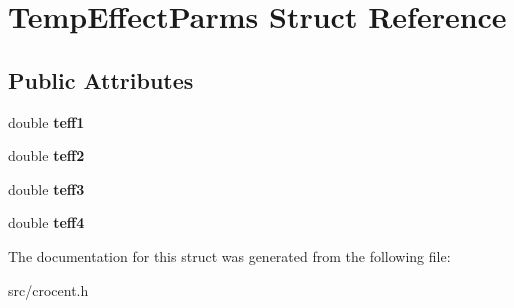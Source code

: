 \hypertarget{struct_temp_effect_parms}{\section{Temp\-Effect\-Parms Struct Reference}
\label{struct_temp_effect_parms}
}
\subsection*{Public Attributes}
\begin{DoxyCompactItemize}
\item 
\hypertarget{struct_temp_effect_parms_afa01c3717f65f25cdce2c831ed492a09}{double {\bfseries teff1}}\label{struct_temp_effect_parms_afa01c3717f65f25cdce2c831ed492a09}

\item 
\hypertarget{struct_temp_effect_parms_a2e0677e1ebdc1818b39ce63ee6e23fb6}{double {\bfseries teff2}}\label{struct_temp_effect_parms_a2e0677e1ebdc1818b39ce63ee6e23fb6}

\item 
\hypertarget{struct_temp_effect_parms_a4bf7bf3daf35d29d2679cfbe64c8301b}{double {\bfseries teff3}}\label{struct_temp_effect_parms_a4bf7bf3daf35d29d2679cfbe64c8301b}

\item 
\hypertarget{struct_temp_effect_parms_a2d28b031dad6a72202eebcf6871cf71c}{double {\bfseries teff4}}\label{struct_temp_effect_parms_a2d28b031dad6a72202eebcf6871cf71c}

\end{DoxyCompactItemize}


The documentation for this struct was generated from the following file\-:\begin{DoxyCompactItemize}
\item 
src/crocent.\-h\end{DoxyCompactItemize}
